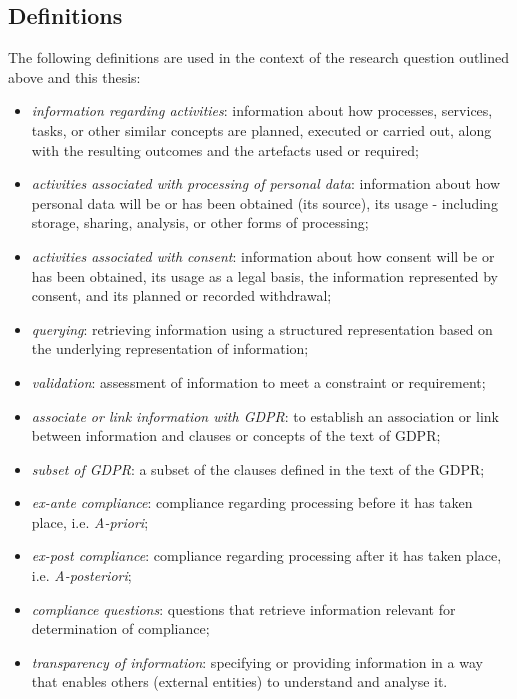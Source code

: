 \subsection{Definitions}\label{sec:intro:definitions}
The following definitions are used in the context of the research question outlined above and this thesis:
\begin{itemize}
    \item \textit{information regarding activities}: information about how processes, services, tasks, or other similar concepts are planned, executed or carried out, along with the resulting outcomes and the artefacts used or required;
    \item \textit{activities associated with processing of personal data}: information about how personal data will be or has been obtained (its source), its usage - including storage, sharing, analysis, or other forms of processing;
    \item \textit{activities associated with consent}: information about how consent will be or has been obtained, its usage as a legal basis, the information represented by consent, and its planned or recorded withdrawal;
    \item \textit{querying}: retrieving information using a structured representation based on the underlying representation of information;
    \item \textit{validation}: assessment of information to meet a constraint or requirement;
    \item \textit{associate or link information with GDPR}: to establish an association or link between information and clauses or concepts of the text of GDPR;
    \item \textit{subset of GDPR}: a subset of the clauses defined in the text of the GDPR;
    \item \textit{ex-ante compliance}: compliance regarding processing before it has taken place, i.e. \textit{A-priori};
    \item \textit{ex-post compliance}: compliance regarding processing after it has taken place, i.e. \textit{A-posteriori};
    \item \textit{compliance questions}: questions that retrieve information relevant for determination of compliance; 
    \item \textit{transparency of information}: specifying or providing information in a way that enables others (external entities) to understand and analyse it.
\end{itemize}

